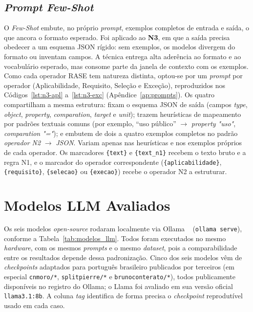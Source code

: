 \subsection{\textit{Prompt Few-Shot}}

O \textit{Few-Shot} embute, no próprio \textit{prompt}, exemplos completos de entrada e saída, o que ancora o formato esperado. Foi aplicado ao \textbf{N3}, em que a saída precisa obedecer a um esquema JSON rígido: sem exemplos, os modelos divergem do formato ou inventam campos. A técnica entrega alta aderência ao formato e ao vocabulário esperado, mas consome parte da janela de contexto com os exemplos. Como cada operador RASE tem natureza distinta, optou-se por um \textit{prompt} por operador (Aplicabilidade, Requisito, Seleção e Exceção), reproduzidos nos Códigos~\ref{lst:n3-apl} a~\ref{lst:n3-exc} (Apêndice~\ref{ap:prompts}). Os quatro compartilham a mesma estrutura: fixam o esquema JSON de saída (campos \textit{type}, \textit{object}, \textit{property}, \textit{comparation}, \textit{target} e \textit{unit}); trazem heurísticas de mapeamento por padrões textuais comuns (por exemplo, ``uso público'' $\rightarrow$ \textit{property "uso"}, \textit{comparation "="}); e embutem de dois a quatro exemplos completos no padrão \textit{operador N2} $\rightarrow$ \textit{JSON}. Variam apenas nas heurísticas e nos exemplos próprios de cada operador. Os marcadores \verb|{text}| e \verb|{text_n1}| recebem o texto bruto e a regra N1, e o marcador do operador correspondente (\verb|{aplicabilidade}|, \verb|{requisito}|, \verb|{selecao}| ou \verb|{execao}|) recebe o operador N2 a estruturar.

\section{Modelos LLM Avaliados}

Os seis modelos \textit{open-source} rodaram localmente via Ollama ~\cite{ollama2024} (\texttt{ollama serve}), conforme a Tabela~\ref{tab:modelos_llm}. Todos foram executados no mesmo \textit{hardware}, com os mesmos \textit{prompts} e o mesmo \textit{dataset}, pois a comparabilidade entre os resultados depende dessa padronização. Cinco dos seis modelos vêm de \textit{checkpoints} adaptados para português brasileiro publicados por terceiros (em especial \texttt{cnmoro/*}, \texttt{splitpierre/*} e \texttt{brunoconterato/*}), todos publicamente disponíveis no registro do Ollama; o Llama foi avaliado em sua versão oficial \texttt{llama3.1:8b}. A coluna \textit{tag} identifica de forma precisa o \textit{checkpoint} reprodutível usado em cada caso.

